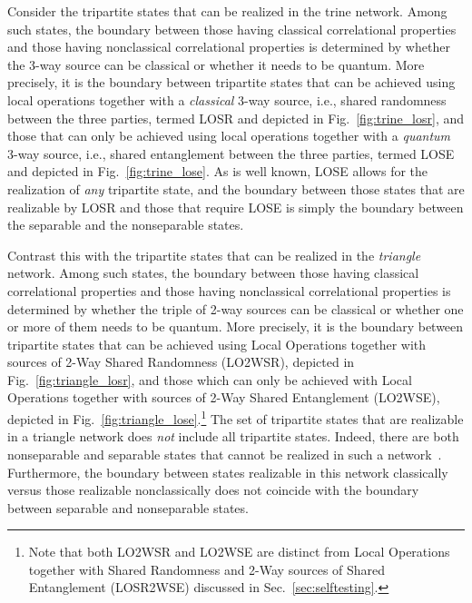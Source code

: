 \documentclass[prx,11pt,letterpaper,twocolumn,accepted=2023-11-27]{quantumarticle}
\theoremstyle{plain}
\theoremstyle{definition}
\begin{document}
\begin{appendices}
Consider the tripartite states that can be realized in the trine network.    Among such states, the boundary between those having classical correlational properties and those having nonclassical correlational properties is determined by whether the 3-way source can be classical or whether it needs to be quantum.
More precisely, it is the boundary between tripartite states that can be achieved using local operations together with a {\em classical} 3-way source, i.e., shared randomness between the three parties,  termed LOSR and depicted in Fig.~\ref{fig:trine_losr}, and those that can only be achieved using local operations together with a {\em quantum} 3-way source, i.e., shared entanglement between the three parties,  termed LOSE~\cite{Gutoski2008,Schmid2021postquantumcommon} and depicted in Fig.~\ref{fig:trine_lose}.
As is well known, LOSE allows for the realization of {\em any} tripartite state, and the boundary between those states that are realizable by LOSR and those that require LOSE is simply 
 the boundary between the separable and the nonseparable states.
 
Contrast this with the tripartite states that can be realized in the {\em triangle} network.    Among such states, the boundary between those having classical correlational properties and those having nonclassical correlational properties is determined by whether the triple of 2-way sources can be classical or whether one or more of them needs to be quantum.
More precisely, it is the boundary between tripartite states 
that can be achieved using  Local Operations together with sources of 2-Way Shared Randomness (LO2WSR), depicted in Fig.~\ref{fig:triangle_losr}, and those which can only be achieved with Local Operations together with sources of 2-Way Shared Entanglement (LO2WSE), 
depicted in Fig.~\ref{fig:triangle_lose}.\footnote{Note that both LO2WSR and LO2WSE are distinct from 
 Local Operations together with Shared Randomness  and 2-Way sources of Shared Entanglement (LOSR2WSE) discussed in Sec.~\ref{sec:selftesting}.}   
The set of tripartite states that are realizable in a triangle network does {\em not} include all tripartite states.  Indeed, there are both nonseparable and separable states that cannot be realized in such a network~\cite{navascues2020genuine}. 
Furthermore, the boundary between states realizable in this network classically versus those realizable nonclassically does not coincide with the boundary between separable and nonseparable states.


\end{appendices}
\end{document}

